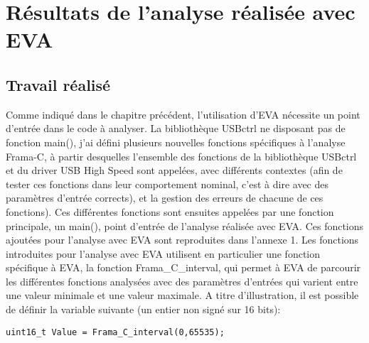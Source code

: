 \section{Résultats de l'analyse réalisée avec EVA}

\subsection{Travail réalisé}

Comme indiqué dans le chapitre précédent, l'utilisation d'EVA nécessite un point d'entrée dans le code à analyser. La bibliothèque USBctrl ne disposant pas de fonction main(), j'ai défini plusieurs nouvelles fonctions spécifiques à l'analyse Frama-C, à partir desquelles l'ensemble des fonctions de la bibliothèque USBctrl et du driver USB High Speed sont appelées, avec différents contextes (afin de tester ces fonctions dans leur comportement nominal, c'est à dire avec des paramètres d'entrée corrects), et la gestion des erreurs de chacune de ces fonctions). Ces différentes fonctions sont ensuites appelées par une fonction principale, un main(), point d'entrée de l'analyse réalisée avec EVA. Ces fonctions ajoutées pour l'analyse avec EVA sont reproduites dans l'annexe 1.
\newline \noindent Les fonctions introduites pour l'analyse avec EVA utilisent en particulier une fonction spécifique à EVA, la fonction Frama\_C\_interval, qui permet à EVA de parcourir les différentes fonctions analysées avec des paramètres d'entrées qui varient entre une valeur minimale et une valeur maximale. A titre d'illustration, il est possible de définir la variable suivante (un entier non signé sur 16 bits):

\begin{lstlisting}
uint16_t Value = Frama_C_interval(0,65535);
\end{lstlisting}

